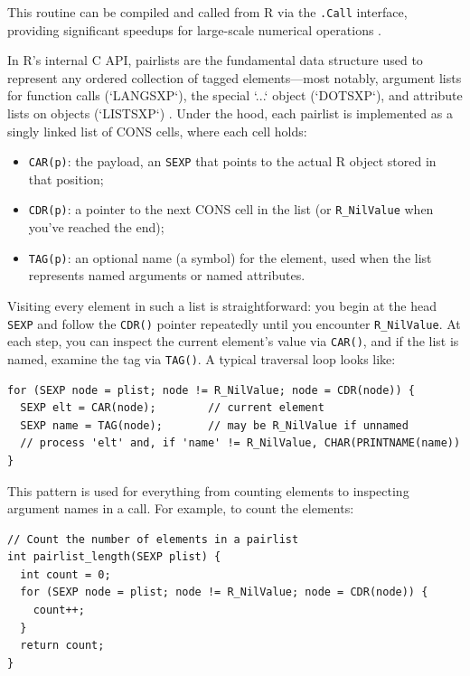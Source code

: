 This routine can be compiled and called from R via the \texttt{.Call} interface, providing significant speedups for large-scale numerical operations \cite{rcore2024}.

In R’s internal C API, pairlists are the fundamental data structure used to represent any ordered collection of tagged elements—most notably, argument lists for function calls (`LANGSXP`), the special `...` object (`DOTSXP`), and attribute lists on objects (`LISTSXP`) \cite{hadley-r-internals-pairlists}.  Under the hood, each pairlist is implemented as a singly linked list of CONS cells, where each cell holds:

\begin{itemize}
  \item \texttt{CAR(p)}: the payload, an \texttt{SEXP} that points to the actual R object stored in that position;
  \item \texttt{CDR(p)}: a pointer to the next CONS cell in the list (or \texttt{R\_NilValue} when you’ve reached the end);
  \item \texttt{TAG(p)}: an optional name (a symbol) for the element, used when the list represents named arguments or named attributes.
\end{itemize}

Visiting every element in such a list is straightforward: you begin at the head \texttt{SEXP} and follow the \texttt{CDR()} pointer repeatedly until you encounter \texttt{R\_NilValue}.  At each step, you can inspect the current element’s value via \texttt{CAR()}, and if the list is named, examine the tag via \texttt{TAG()}.  A typical traversal loop looks like:

\begin{verbatim}
for (SEXP node = plist; node != R_NilValue; node = CDR(node)) {
  SEXP elt = CAR(node);        // current element
  SEXP name = TAG(node);       // may be R_NilValue if unnamed
  // process 'elt' and, if 'name' != R_NilValue, CHAR(PRINTNAME(name))
}
\end{verbatim}

This pattern is used for everything from counting elements to inspecting argument names in a call.  For example, to count the elements:

\begin{verbatim}
// Count the number of elements in a pairlist
int pairlist_length(SEXP plist) {
  int count = 0;
  for (SEXP node = plist; node != R_NilValue; node = CDR(node)) {
    count++;
  }
  return count;
}
\end{verbatim}

